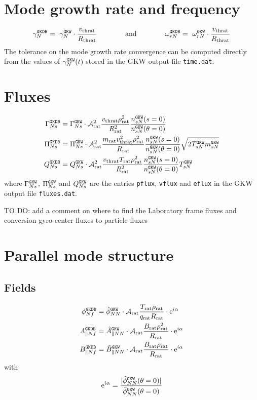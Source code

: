 \documentclass[a4paper]{report}
\begin{document}
\section{Mode growth rate and frequency}
\begin{equation}
\gamma_N^\gkdb= \gamma_N^\gkw \cdot \frac{v_\textrm{thrat}}{R_\textrm{thrat}} \qquad\qquad \textrm{and}
\qquad \qquad \omega_{rN}^\gkdb= \omega_{rN}^\gkw \cdot \frac{v_\textrm{thrat}}{R_\textrm{thrat}}
\end{equation}
The tolerance on the mode growth rate convergence can be computed directly from the values of $\gamma_N^{\texttt{GKW}}(t)$ stored in the GKW output file \texttt{time.dat}.

\section{Fluxes}
\begin{align}
\Gamma_{Ns}^{\texttt{GKDB}} &= \Gamma_{Ns}^{\texttt{GKW}} \cdot \mathcal{A}_\textrm{rat}^2\frac{v_\textrm{thrat}\rho_\textrm{rat}^2}{R_\textrm{rat}^2}\frac{n_{sN}^{\texttt{GKW}}(s=0)}{n_{sN}^{\texttt{GKW}}(\theta=0)}\\
\Pi_{Ns}^{\texttt{GKDB}} &= \Pi_{Ns}^{\texttt{GKW}} \cdot \mathcal{A}_\textrm{rat}^2\frac{m_\textrm{rat}v_\textrm{thrat}^2\rho_\textrm{rat}^2}{R_\textrm{rat}}\frac{n_{sN}^{\texttt{GKW}}(s=0)}{n_{sN}^{\texttt{GKW}}(\theta=0)}\sqrt{2T_{sN}^{\texttt{GKW}} m_{sN}^{\texttt{GKW}}}\\
Q_{Ns}^{\texttt{GKDB}} &= Q_{Ns}^{\texttt{GKW}} \cdot \mathcal{A}_\textrm{rat}^2\frac{v_\textrm{thrat}T_\textrm{rat}\rho_\textrm{rat}^2}{R_\textrm{rat}^2}\frac{n_{sN}^{\texttt{GKW}}(s=0)}{n_{sN}^{\texttt{GKW}}(\theta=0)}T_{sN}^{\texttt{GKW}}
\end{align}
where $\Gamma_{Ns}^{\texttt{GKW}}$, $\Pi_{Ns}^{\texttt{GKW}}$ and $Q_{Ns}^{\texttt{GKW}}$ are the entries \texttt{pflux}, \texttt{vflux} and \texttt{eflux} in the GKW output file \texttt{fluxes.dat}.

TO DO: add a comment on where to find the Laboratory frame fluxes and conversion gyro-center fluxes to particle fluxes
  
\section{Parallel mode structure}  
\subsection{Fields}
\begin{align}
\phi_{Nf}^{\texttt{GKDB}} &= \hat{\phi}_{NN}^{\texttt{GKW}}\cdot \mathcal{A}_\textrm{rat}\frac{T_\textrm{rat}\rho_\textrm{rat}}{q_\textrm{rat}R_\textrm{rat}}\cdot \textrm{e}^{i\alpha}\\
A_{\parallel Nf}^{\texttt{GKDB}} &= \hat{A}_{\parallel NN}^{\texttt{GKW}}\cdot \mathcal{A}_\textrm{rat}\frac{B_\textrm{rat}\rho_\textrm{rat}^2}{R_\textrm{rat}}\cdot \textrm{e}^{i\alpha}\\
B_{\parallel Nf}^{\texttt{GKDB}} &= \hat{B}_{\parallel NN}^{\texttt{GKW}}\cdot \mathcal{A}_\textrm{rat}\frac{B_\textrm{rat}\rho_\textrm{rat}}{R_\textrm{rat}}\cdot \textrm{e}^{i\alpha}
\end{align}
with
\begin{equation}
\textrm{e}^{i\alpha} = \frac{|\hat{\phi}_{NN}^{\texttt{GKW}}(\theta=0)|}{\hat{\phi}_{NN}^{\texttt{GKW}}(\theta=0)}
\end{equation}
\end{document}
